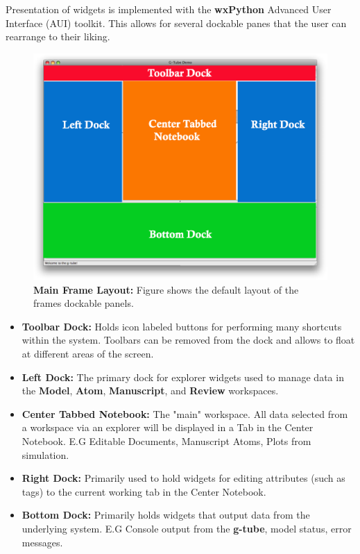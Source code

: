 \documentclass[12pt]{article}
\begin{document}
Presentation of widgets is implemented with the {\bf wxPython} Advanced User Interface (AUI) toolkit. This allows for several dockable panes that the user can rearrange to their liking. 

\begin{figure}[ht]
   \centering
   \includegraphics[scale=0.6]{figures/RealEstate.eps}
   \caption{{\bf Main Frame Layout:} Figure shows the default layout of the frames dockable panels.}
   \label{fig:Real Estate}
\end{figure}

\begin{itemize}
\item[] {\bf Toolbar Dock:} Holds icon labeled buttons for performing many shortcuts within the system. Toolbars can be removed from the dock and allows to float at different areas of the screen.
\item[] {\bf Left Dock:} The primary dock for explorer widgets used to manage data in the {\bf Model}, {\bf Atom}, {\bf Manuscript}, and {\bf Review} workspaces.
\item[] {\bf Center Tabbed Notebook:} The "main" workspace. All data selected from a workspace via an explorer will be displayed in a Tab in the Center Notebook. E.G Editable Documents, Manuscript Atoms, Plots from simulation.
\item[] {\bf Right Dock:} Primarily used to hold widgets for editing attributes (such as tags) to the current working tab in the Center Notebook.
\item[] {\bf Bottom Dock:} Primarily holds widgets that output data from the underlying system. E.G Console output from the {\bf g-tube}, model status, error messages.
\end{itemize}
\end{document}
